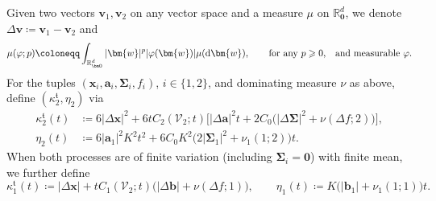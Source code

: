 \documentclass[en,oneside,bbfont,article]{amsart}
\theoremstyle{remark}
\theoremstyle{definition}
\theoremstyle{definition}
\newcommand{\V}{\bm{\mathcal{V}}}
\newcommand\R{\mathbb{R}}
\newcommand\1{\mathds{1}}
\renewcommand\ge{\geqslant}
\newcommand{\D}{\mathrm{d}}
\newcommand{\mft}{{\mathfrak{t}}}
\begin{document}
Given two vectors $\bm{v}_1,\bm{v}_2$ on any vector space and a measure $\mu$ on $\R^d_{\bm{0}}$, we denote $\Delta\bm{v}\coloneqq\bm{v}_1-\bm{v}_2$ and
\[
\mu(\varphi;p)
\coloneqq \int_{\R^d_{\bm 0}}|\bm{w}|^p|\varphi(\bm{w})|\mu(\D\bm{w}),
\qquad\text{for any }p\ge 0,
\enskip\text{ and measurable }\varphi.
\]
For the tuples $(\bm{x}_i,\bm{a}_i,\bm{\Sigma}_i,f_i)$, $i\in\{1,2\}$, and dominating measure $\nu$ as above, define $(\kappa_2^\mft,\eta_2)$ via
\begin{equation}
\label{eq:kappa_eta2}
\begin{split}
\kappa_2^\mft(t)
& \coloneqq 
6|\Delta\bm{x}|^2
+6tC_2(\V_2;t)\big[|\Delta\bm{a}|^2t
+2C_0\big(
|\Delta\bm\Sigma|^2
+\nu(\Delta f;2)\big)\big],\\ 
\eta_2(t)
&\coloneqq 6|\bm{a}_1|^2 K^2 t^2
+6C_0K^2\big(2|\bm{\Sigma}_1|^2
+\nu_1(1;2)
\big)t.
\end{split}
\end{equation}
When both processes are of finite variation (including $\bm{\Sigma}_i=\bm{0}$) with finite mean, we further define
\begin{equation}
\label{eq:kappa_eta1}
\kappa_1^\mft(t)
\coloneqq 
|\Delta\bm{x}|
+ t C_1(\V_2;t)\big(|\Delta\bm{b}|
+\nu(\Delta f;1)\big),
\qquad
\eta_1(t)
\coloneqq 
K\big(|\bm{b}_1|
+\nu_1(1;1)
\big)t.
\end{equation}
\end{document}

